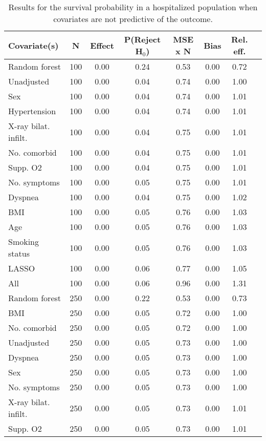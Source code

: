 \documentclass{article}
\begin{document}
\clearpage

{\tabcolsep=6pt  %
\begin{longtable}{lccccccc}
\caption{Results for the survival probability in a hospitalized population when covariates are not predictive of the outcome.} \\
Covariate(s) & N & Effect & P(Reject H$_0$) & MSE x N & Bias & Rel. eff.\\ \midrule
Random forest & 100 & 0.00 & 0.24 & 0.53 & 0.00 & 0.72 \\ 
Unadjusted & 100 & 0.00 & 0.04 & 0.74 & 0.00 & 1.00 \\ 
Sex & 100 & 0.00 & 0.04 & 0.74 & 0.00 & 1.01 \\ 
Hypertension & 100 & 0.00 & 0.04 & 0.74 & 0.00 & 1.01 \\ 
X-ray bilat. infilt. & 100 & 0.00 & 0.04 & 0.75 & 0.00 & 1.01 \\ 
No. comorbid & 100 & 0.00 & 0.04 & 0.75 & 0.00 & 1.01 \\ 
Supp. O2 & 100 & 0.00 & 0.04 & 0.75 & 0.00 & 1.01 \\ 
No. symptoms & 100 & 0.00 & 0.05 & 0.75 & 0.00 & 1.01 \\ 
Dyspnea & 100 & 0.00 & 0.04 & 0.75 & 0.00 & 1.02 \\ 
BMI & 100 & 0.00 & 0.05 & 0.76 & 0.00 & 1.03 \\ 
Age & 100 & 0.00 & 0.05 & 0.76 & 0.00 & 1.03 \\ 
Smoking status & 100 & 0.00 & 0.05 & 0.76 & 0.00 & 1.03 \\ 
LASSO & 100 & 0.00 & 0.06 & 0.77 & 0.00 & 1.05 \\ 
All & 100 & 0.00 & 0.06 & 0.96 & 0.00 & 1.31 \\ \midrule() 
Random forest & 250 & 0.00 & 0.22 & 0.53 & 0.00 & 0.73 \\ 
BMI & 250 & 0.00 & 0.05 & 0.72 & 0.00 & 1.00 \\ 
No. comorbid & 250 & 0.00 & 0.05 & 0.72 & 0.00 & 1.00 \\ 
Unadjusted & 250 & 0.00 & 0.05 & 0.73 & 0.00 & 1.00 \\ 
Dyspnea & 250 & 0.00 & 0.05 & 0.73 & 0.00 & 1.00 \\ 
Sex & 250 & 0.00 & 0.05 & 0.73 & 0.00 & 1.00 \\ 
No. symptoms & 250 & 0.00 & 0.05 & 0.73 & 0.00 & 1.00 \\ 
X-ray bilat. infilt. & 250 & 0.00 & 0.05 & 0.73 & 0.00 & 1.01 \\ 
Supp. O2 & 250 & 0.00 & 0.05 & 0.73 & 0.00 & 1.01 \\ 

\end{longtable}}
\end{document}
